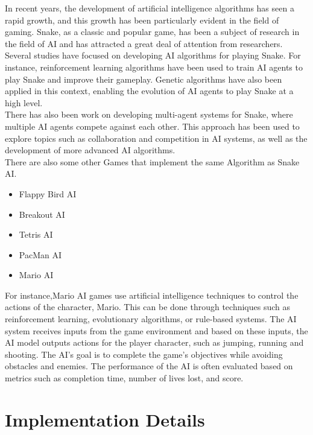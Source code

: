 \documentclass[a4paper,12pt]{article}
\begin{document}
In recent years, the development of artificial intelligence algorithms has seen a rapid growth,
and this growth has been particularly evident in the field of gaming. Snake, as a classic and popular game, 
has been a subject of research in the field of AI and has attracted a great deal of attention from researchers.\\
Several studies have focused on developing AI algorithms for playing Snake. For instance, reinforcement learning 
algorithms have been used to train AI agents to play Snake and improve their gameplay. Genetic algorithms have also
been applied in this context, enabling the evolution of AI agents to play Snake at a high level.\\
There has also been work on developing multi-agent systems for Snake, where multiple AI agents compete against each other.
This approach has been used to explore topics such as collaboration and competition in AI systems, as well as the development of more advanced AI algorithms.\\
There are also some other Games that implement the same Algorithm as Snake AI.\cite{RelatedWork}
\begin{itemize}
\item Flappy Bird AI
\item Breakout AI
\item Tetris AI
\item PacMan AI
\item Mario AI
\end{itemize}
For instance,Mario AI games use artificial intelligence techniques to control the actions of the character,
Mario. This can be done through techniques such as reinforcement learning, evolutionary algorithms,
or rule-based systems. The AI system receives inputs from the game environment and based on these inputs,
the AI model outputs actions for the player character, such as jumping, running and shooting.
The AI's goal is to complete the game's objectives while avoiding obstacles and enemies.
The performance of the AI is often evaluated based on metrics such as completion time, number of lives lost, and score.

\section{Implementation Details}
\end{document}
